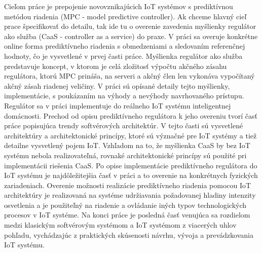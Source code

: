 \indent Cieľom práce je prepojenie novovznikajúcich IoT systémov s prediktívnou metódou riadenia (MPC - model predictive controller). Ak chceme hlavný cieľ prace špecifikovať do detailu, tak ide tu o overenie zavedenia myšlienky regulátor ako služba (CaaS - controller as a service) do praxe. V práci sa overuje konkrétne online forma prediktívneho riadenia s obmedzeniami a sledovaním referenčnej hodnoty, čo je vysvetlené v prvej časti práce. Myšlienka regulátor ako služba predstavuje koncept, v ktorom je celá zložitosť výpočtu akčného zásahu regulátora, ktorú MPC prináša, na serveri a akčný člen len vykonáva vypočítaný akčný zásah riadenej veličiny. V práci sú opísané detaily tejto myšlienky, implementácie, s poukázaním na výhody a nevýhody navrhovaného prístupu. Regulátor sa v práci implementuje do reálneho IoT systému inteligentnej domácnosti. Prechod od opisu prediktívneho regulátora k jeho overeniu tvorí časť práce popisujúca trendy softvérových architektúr. V tejto časti sú vysvetlené architektúry a architektonické princípy, ktoré sú význačné pre IoT systémy a tiež detailne vysvetlený pojem IoT. Vzhľadom na to, že myšlienka CaaS by bez IoT systému nebola realizovateľná, rovnaké architektonické princípy sú použité  pri implementácii riešenia CaaS. Po opise implementácie prediktívneho regulátora do IoT systému je najdôležitejšia časť v práci a to overenie na konkrétnych fyzických zariadeniach. Overenie možnosti realizácie prediktívneho riadenia pomocou IoT architektúry je realizovaná na systéme udržiavania požadovanej hladiny intenzity osvetlenia a je použiteľný na riadenie a ovládanie iných typov technologických procesov v IoT systéme. Na konci práce je posledná časť venujúca sa rozdielom medzi klasickým softvérovým systémom a IoT systémom z viacerých uhlov pohľadu, vychádzajúc z praktických skúsenosti návrhu, vývoja a prevádzkovania IoT systému.
